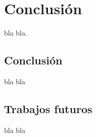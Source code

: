 \chapter{Conclusi\'on}
\label{chap:conc}
\minitoc

bla bla.


\section{Conclusi\'on}

bla bla

\section{Trabajos futuros}
bla bla
